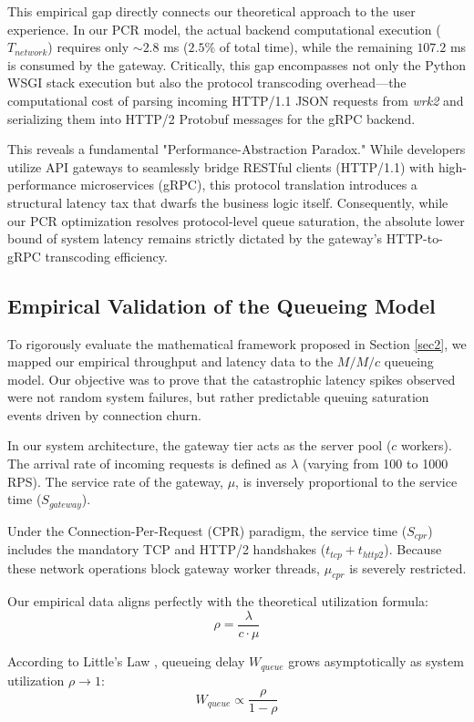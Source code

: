 \documentclass{ieeeaccess}
\begin{document}
This empirical gap directly connects our theoretical approach to the user experience. In our PCR model, the actual backend computational execution ($T_{network}$) requires only $\sim 2.8$ ms ($2.5\%$ of total time), while the remaining $107.2$ ms is consumed by the gateway. Critically, this gap encompasses not only the Python WSGI \cite{wsgi-pep} stack execution but also the protocol transcoding overhead—the computational cost of parsing incoming HTTP/1.1 JSON requests from \textit{wrk2} and serializing them into HTTP/2 Protobuf messages for the gRPC backend. 

This reveals a fundamental "Performance-Abstraction Paradox." While developers utilize API gateways to seamlessly bridge RESTful clients (HTTP/1.1) with high-performance microservices (gRPC), this protocol translation introduces a structural latency tax that dwarfs the business logic itself. Consequently, while our PCR optimization resolves protocol-level queue saturation, the absolute lower bound of system latency remains strictly dictated by the gateway's HTTP-to-gRPC transcoding efficiency.

\subsection{Empirical Validation of the Queueing Model}

To rigorously evaluate the mathematical framework proposed in Section \ref{sec2}, we mapped our empirical throughput and latency data to the $M/M/c$ queueing model. Our objective was to prove that the catastrophic latency spikes observed were not random system failures, but rather predictable queuing saturation events driven by connection churn.

In our system architecture, the gateway tier acts as the server pool ($c$ workers). The arrival rate of incoming requests is defined as $\lambda$ (varying from 100 to 1000 RPS). The service rate of the gateway, $\mu$, is inversely proportional to the service time ($S_{gateway}$). 

Under the Connection-Per-Request (CPR) paradigm, the service time ($S_{cpr}$) includes the mandatory TCP and HTTP/2 handshakes ($t_{tcp} + t_{http2}$). Because these network operations block gateway worker threads, $\mu_{cpr}$ is severely restricted. 

Our empirical data aligns perfectly with the theoretical utilization formula: 
$$
\rho = \frac{\lambda}{c \cdot \mu}
$$

According to Little's Law \cite{little2011or}, queueing delay $W_{queue}$ grows asymptotically as system utilization $\rho \to 1$:
$$
W_{queue} \propto \frac{\rho}{1 - \rho}
$$
\end{document}
